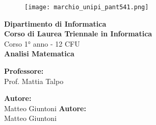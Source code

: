 \begin{titlepage} %
\begin{figure}[t] %
    \centering\texttt{[image: marchio\_unipi\_pant541.png]}
\end{figure}
\vspace{20mm}

\begin{Large}
 \begin{center}
	\textbf{Dipartimento di Informatica\\ Corso di Laurea Triennale in Informatica\\}
	\vspace{20mm}
    {\LARGE{Corso 1° anno - 12 CFU}}\\
	\vspace{10mm}
	{\huge{\bf Analisi Matematica}}\\
\end{center}
\end{Large}


\vspace{36mm}
\begin{minipage}[t]{0.47\textwidth}
	{\large{\bf Professore:}\\ \large{Prof. Mattia Talpo}}
\end{minipage}
\hfill
\begin{minipage}[t]{0.47\textwidth}\raggedleft
	{\large{\bf Autore:}\\ \large{Matteo Giuntoni}}
	{\large{\bf Autore:}\\ \large{Matteo Giuntoni}}
\end{minipage}

\vspace{25mm}

\hrulefill

\vspace{5mm}


\end{titlepage}